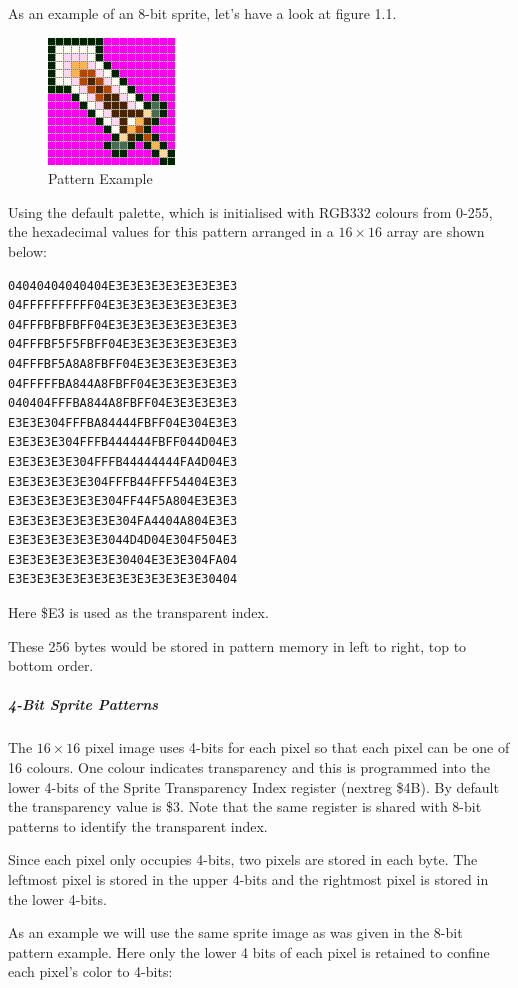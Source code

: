 As an example of an 8-bit sprite, let’s have a look at figure 1.1.

\begin{figure}\centering
  \includegraphics{video/sprite_1.png}
  \caption{Pattern Example}
\end{figure}

Using the default palette, which is initialised with RGB332 colours
from 0-255, the hexadecimal values for this pattern arranged in a
$16\times16$ array are shown below:

\begin{verbatim}
04040404040404E3E3E3E3E3E3E3E3E3
04FFFFFFFFFF04E3E3E3E3E3E3E3E3E3
04FFFBFBFBFF04E3E3E3E3E3E3E3E3E3
04FFFBF5F5FBFF04E3E3E3E3E3E3E3E3
04FFFBF5A8A8FBFF04E3E3E3E3E3E3E3
04FFFFFBA844A8FBFF04E3E3E3E3E3E3
040404FFFBA844A8FBFF04E3E3E3E3E3
E3E3E304FFFBA84444FBFF04E304E3E3
E3E3E3E304FFFB444444FBFF044D04E3
E3E3E3E3E304FFFB44444444FA4D04E3
E3E3E3E3E3E304FFFB44FFF54404E3E3
E3E3E3E3E3E3E304FF44F5A804E3E3E3
E3E3E3E3E3E3E3E304FA4404A804E3E3
E3E3E3E3E3E3E3044D4D04E304F504E3
E3E3E3E3E3E3E3E30404E3E3E304FA04
E3E3E3E3E3E3E3E3E3E3E3E3E3E30404

\end{verbatim}
Here \$E3 is used as the transparent index.

These 256 bytes would be stored in pattern memory in left to right,
top to bottom order.

\subparagraph{4-Bit Sprite Patterns}

The $16\times16$ pixel image uses 4-bits for each pixel so that each
pixel can be one of 16 colours. One colour indicates transparency and
this is programmed into the lower 4-bits of the Sprite Transparency
Index register (nextreg \$4B). By default the transparency value is
\$3. Note that the same register is shared with 8-bit patterns to
identify the transparent index.

Since each pixel only occupies 4-bits, two pixels are stored in each
byte. The leftmost pixel is stored in the upper 4-bits and the
rightmost pixel is stored in the lower 4-bits.

As an example we will use the same sprite image as was given in the
8-bit pattern example. Here only the lower 4 bits of each pixel is
retained to confine each pixel’s color to 4-bits:

